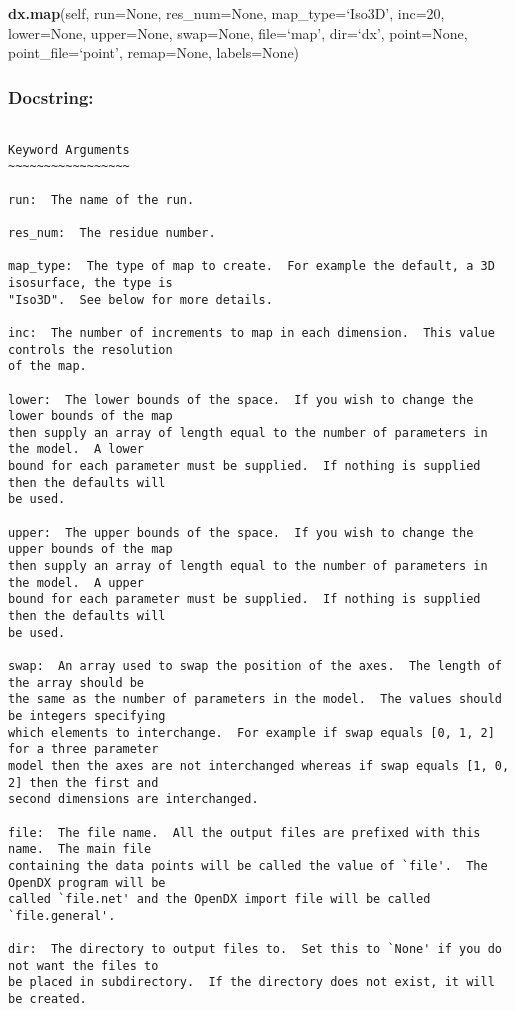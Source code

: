 \textsf{\textbf{dx.map}(self, run=None, res\_num=None, map\_type=`Iso3D', inc=20, lower=None, upper=None, swap=None, file=`map', dir=`dx', point=None, point\_file=`point', remap=None, labels=None)
}


\subsubsection{Docstring:}

{\scriptsize
\begin{verbatim}

Keyword Arguments
~~~~~~~~~~~~~~~~~

run:  The name of the run.

res_num:  The residue number.

map_type:  The type of map to create.  For example the default, a 3D isosurface, the type is
"Iso3D".  See below for more details.

inc:  The number of increments to map in each dimension.  This value controls the resolution
of the map.

lower:  The lower bounds of the space.  If you wish to change the lower bounds of the map
then supply an array of length equal to the number of parameters in the model.  A lower
bound for each parameter must be supplied.  If nothing is supplied then the defaults will
be used.

upper:  The upper bounds of the space.  If you wish to change the upper bounds of the map
then supply an array of length equal to the number of parameters in the model.  A upper
bound for each parameter must be supplied.  If nothing is supplied then the defaults will
be used.

swap:  An array used to swap the position of the axes.  The length of the array should be
the same as the number of parameters in the model.  The values should be integers specifying
which elements to interchange.  For example if swap equals [0, 1, 2] for a three parameter
model then the axes are not interchanged whereas if swap equals [1, 0, 2] then the first and
second dimensions are interchanged.

file:  The file name.  All the output files are prefixed with this name.  The main file
containing the data points will be called the value of `file'.  The OpenDX program will be
called `file.net' and the OpenDX import file will be called `file.general'.

dir:  The directory to output files to.  Set this to `None' if you do not want the files to
be placed in subdirectory.  If the directory does not exist, it will be created.


\end{verbatim}}
